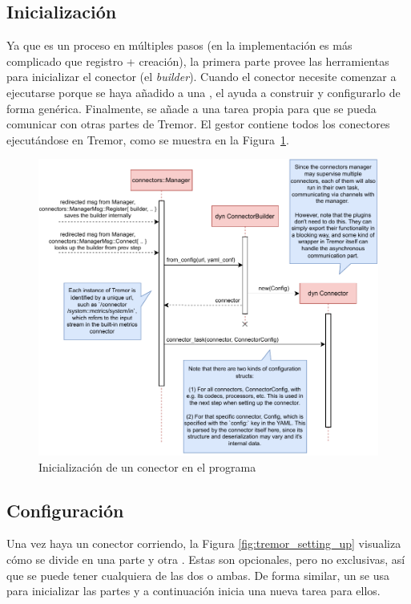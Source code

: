\subsection{Inicialización}

Ya que es un proceso en múltiples pasos (en la implementación es más complicado
que registro + creación), la primera parte provee las herramientas para
inicializar el conector (el \emph{builder}). Cuando el conector necesite
comenzar a ejecutarse porque se haya añadido a una \pipeline, el \builder ayuda
a construir y configurarlo de forma genérica. Finalmente, se añade a una tarea
propia para que se pueda comunicar con otras partes de Tremor. El gestor
 contiene todos los conectores ejecutándose en Tremor,
como se muestra en la Figura~\ref{fig:tremor_initializing}.

\begin{figure}
    \centering
    \includegraphics[width=\textwidth]{./Imagenes/initializing.pdf}
    \caption{Inicialización de un conector en el programa}%
    \label{fig:tremor_initializing}
\end{figure}

\subsection{Configuración}

Una vez haya un conector corriendo, la Figura \ref{fig:tremor_setting_up}
visualiza cómo se divide en una parte \sink y otra \source. Estas son
opcionales, pero no exclusivas, así que se puede tener cualquiera de las dos o
ambas. De forma similar, un \builder se usa para inicializar las partes y a
continuación inicia una nueva tarea para ellos.

